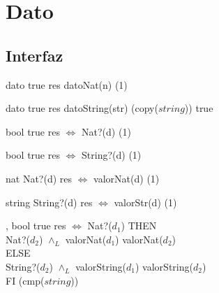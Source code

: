 \section{Dato}

\subsection{Interfaz}

\iusa{}

\ioperaciones

{} %
{dato} %
{true} %
{res \igobs datoNat(n)} %
{\bigo(1)} %
{} %
{} %

{}
{dato}
{true}
{res \igobs datoString(str)}
{\bigo(copy($string$))}
{true}
{}

{}
{bool}
{true}
{res $\iff$ Nat?(d)}
{\bigo(1)}
{}
{}

{}
{bool}
{true}
{res $\iff$ String?(d)}
{\bigo(1)}
{}
{}

{}
{nat}
{Nat?(d)}
{res $\iff$ valorNat(d)}
{\bigo(1)}
{}
{}

{}
{string}
{String?(d)}
{res $\iff$ valorStr(d)}
{\bigo(1)}
{}
{}

\operacion{$\bullet == \bullet$}
{, }
{bool}
{true}
{res $\iff$ \IFL Nat?($d_1$) THEN \\
    \hspace*{10.5em} Nat?($d_2$) $\land_L$ valorNat($d_1$) \igobs valorNat($d_2$) \\
    \hspace*{9em} ELSE \\
    \hspace*{10.5em} String?($d_2$) $\land_L$ valorString($d_1$) \igobs valorString($d_2$) \\
    \hspace*{9em} FI }
{\bigo(cmp($string$))}
{}
{}

